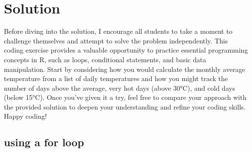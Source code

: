 \documentclass[
]{book}
\begin{document}
\hypertarget{solution}{%
\section{Solution}\label{solution}}

Before diving into the solution, I encourage all students to take a moment to challenge themselves and attempt to solve the problem independently. This coding exercise provides a valuable opportunity to practice essential programming concepts in R, such as loops, conditional statements, and basic data manipulation. Start by considering how you would calculate the monthly average temperature from a list of daily temperatures and how you might track the number of days above the average, very hot days (above 30°C), and cold days (below 15°C). Once you've given it a try, feel free to compare your approach with the provided solution to deepen your understanding and refine your coding skills. Happy coding!

\hypertarget{using-a-for-loop}{%
\subsection{using a for loop}\label{using-a-for-loop}}
\end{document}
